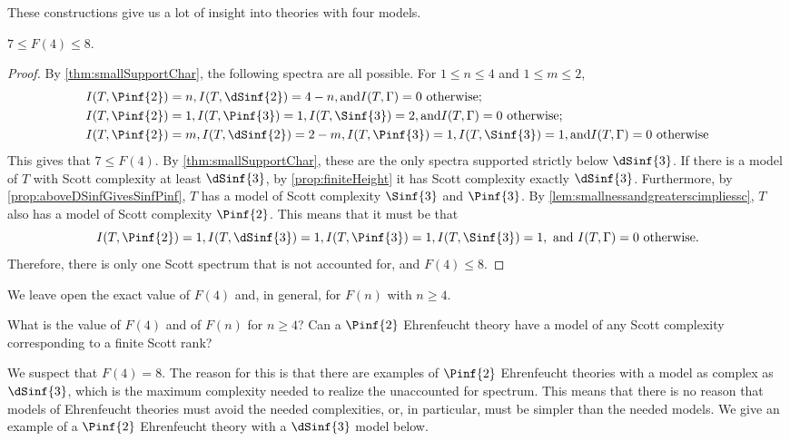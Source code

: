 \documentclass[10pt,a4paper]{amsart}
\renewcommand{\-}{\text{-}}
\begin{document}
These constructions give us a lot of insight into theories with four models.
\begin{proposition}
$7\leq F(4)\leq 8$.
\end{proposition}

\begin{proof}
By \cref{thm:smallSupportChar}, the following spectra are all possible.
For $1\leq n\leq 4$ and $1\leq m\leq 2$,
\begin{align*} &I(T,\Pinf{2})=n , I(T,\dSinf{2})=4-n , \text{and}  I(T,\Gamma)=0 \text{ otherwise;}\\
 &I(T,\Pinf{2})=1 , I(T,\Pinf{3})=1 , I(T,\Sinf{3})=2 , \text{and} I(T,\Gamma)=0 \text{ otherwise;}\\
 &I(T,\Pinf{2})=m ,  I(T,\dSinf{2})=2-m ,  I(T,\Pinf{3})=1 , I(T,\Sinf{3})=1 , \text{and} I(T,\Gamma)=0 \text{ otherwise}\end{align*}
This gives that $7\leq F(4)$.
By \cref{thm:smallSupportChar}, these are the only spectra supported strictly below $\dSinf{3}$.
If there is a model of $T$ with Scott complexity at least $\dSinf{3}$, by \cref{prop:finiteHeight} it has Scott complexity exactly $\dSinf{3}$.
Furthermore, by \cref{prop:aboveDSinfGivesSinfPinf}, $T$ has a model of Scott complexity $\Sinf{3}$ and $\Pinf{3}$.
By \cref{lem:smallnessandgreaterscimpliessc}, $T$ also has a model of Scott complexity $\Pinf{2}$.
This means that it must be that 
\[ I(T,\Pinf{2})=1 ,  I(T,\dSinf{3})=1 ,  I(T,\Pinf{3})=1 , I(T,\Sinf{3})=1 ,\text{ and } I(T,\Gamma)=0 \text{ otherwise.}\]
Therefore, there is only one Scott spectrum that is not accounted for, and $F(4)\leq 8$.
\end{proof}

We leave open the exact value of $F(4)$ and, in general, for $F(n)$ with $n\geq 4$.

\begin{question}
What is the value of $F(4)$ and of $F(n)$ for $n\geq 4$? Can a $\Pinf{2}$ Ehrenfeucht theory have a model of any Scott complexity corresponding to a finite Scott rank?
\end{question}

We suspect that $F(4)=8$.
The reason for this is that there are examples of $\Pinf{2}$ Ehrenfeucht theories with a model as complex as $\dSinf{3}$, which is the maximum complexity needed to realize the unaccounted for spectrum.
This means that there is no reason that models of Ehrenfeucht theories must avoid the needed complexities, or, in particular, must be simpler than the needed models.
We give an example of a $\Pinf{2}$ Ehrenfeucht theory with a $\dSinf{3}$ model below.
\end{document}
